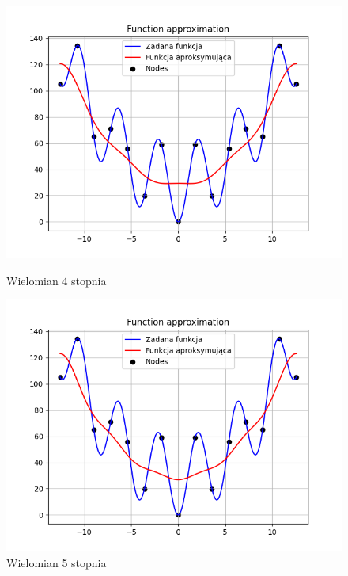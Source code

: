 \documentclass{article}
\begin{document}
\begin{figure}[H]
  \begin{minipage}[b]{0.49\textwidth}
    \begin{minipage}[b]{\textwidth}
      \includegraphics[width=\textwidth]{img09.png}
      \caption{Wielomian 4 stopnia}
    \end{minipage}
    \vspace*{\fill}
    \begin{minipage}[b]{\textwidth}
      \includegraphics[width=\textwidth]{img10.png}
      \caption{Wielomian 5 stopnia}
    \end{minipage}
  \end{minipage}
  \hfill
  \begin{minipage}[b]{0.49\textwidth}

\end{minipage}
\end{figure}
\end{document}
